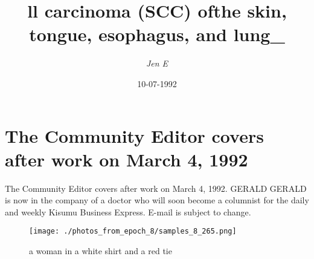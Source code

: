 \documentclass{article}%
\title{ll carcinoma (SCC) ofthe skin, tongue, esophagus, and lung\_}%
\author{\textit{Jen E}}%
\date{10-07-1992}%
\begin{document}
%
\normalsize%
\maketitle%
\section{The Community Editor covers after work on March 4, 1992}%
\label{sec:TheCommunityEditorcoversafterworkonMarch4,1992}%
The Community Editor covers after work on March 4, 1992.                 \newline%
GERALD GERALD is now in the company of a doctor who will soon become a columnist for the daily and weekly Kisumu Business Express.\newline%
E{-}mail is subject to change.                                                                                                                                                                                                                                                                                                                                                                                                                                                                                                                                                                                                                                                                                                                                                                                                                                                                                                                                         

%


\begin{figure}[h!]%
\centering%
\texttt{[image: ./photos\_from\_epoch\_8/samples\_8\_265.png]}%
\caption{a woman in a white shirt and a red tie}%
\end{figure}

%
\end{document}
